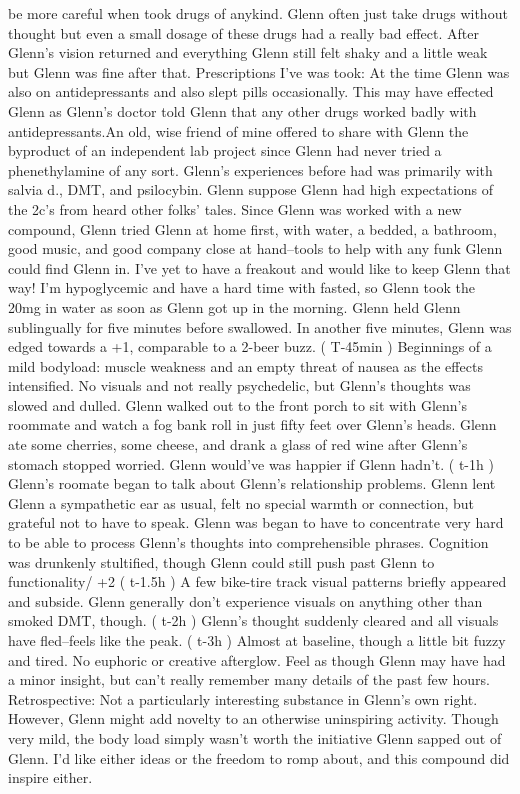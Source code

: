 \documentclass[12pt]{book}
\begin{document}
be more careful when took drugs of anykind. Glenn often just take drugs without thought but even a small dosage of these drugs had a really bad effect. After Glenn's vision returned and everything Glenn still felt shaky and a little weak but Glenn was fine after that. Prescriptions I've was took: At the time Glenn was also on antidepressants and also slept pills occasionally. This may have effected Glenn as Glenn's doctor told Glenn that any other drugs worked badly with antidepressants.An old, wise friend of mine offered to share with Glenn the byproduct of an independent lab project since Glenn had never tried a phenethylamine of any sort. Glenn's experiences before had was primarily with salvia d., DMT, and psilocybin. Glenn suppose Glenn had high expectations of the 2c's from heard other folks' tales. Since Glenn was worked with a new compound, Glenn tried Glenn at home first, with water, a bedded, a bathroom, good music, and good company close at hand--tools to help with any funk Glenn could find Glenn in. I've yet to have a freakout and would like to keep Glenn that way! I'm hypoglycemic and have a hard time with fasted, so Glenn took the 20mg in water as soon as Glenn got up in the morning. Glenn held Glenn sublingually for five minutes before swallowed. In another five minutes, Glenn was edged towards a +1, comparable to a 2-beer buzz. ( T-45min ) Beginnings of a mild bodyload: muscle weakness and an empty threat of nausea as the effects intensified. No visuals and not really psychedelic, but Glenn's thoughts was slowed and dulled. Glenn walked out to the front porch to sit with Glenn's roommate and watch a fog bank roll in just fifty feet over Glenn's heads. Glenn ate some cherries, some cheese, and drank a glass of red wine after Glenn's stomach stopped worried. Glenn would've was happier if Glenn hadn't. ( t-1h ) Glenn's roomate began to talk about Glenn's relationship problems. Glenn lent Glenn a sympathetic ear as usual, felt no special warmth or connection, but grateful not to have to speak. Glenn was began to have to concentrate very hard to be able to process Glenn's thoughts into comprehensible phrases. Cognition was drunkenly stultified, though Glenn could still push past Glenn to functionality/ +2 ( t-1.5h ) A few bike-tire track visual patterns briefly appeared and subside. Glenn generally don't experience visuals on anything other than smoked DMT, though. ( t-2h ) Glenn's thought suddenly cleared and all visuals have fled--feels like the peak. ( t-3h ) Almost at baseline, though a little bit fuzzy and tired. No euphoric or creative afterglow. Feel as though Glenn may have had a minor insight, but can't really remember many details of the past few hours. Retrospective: Not a particularly interesting substance in Glenn's own right. However, Glenn might add novelty to an otherwise uninspiring activity. Though very mild, the body load simply wasn't worth the initiative Glenn sapped out of Glenn. I'd like either ideas or the freedom to romp about, and this compound did inspire either.
\end{document}
